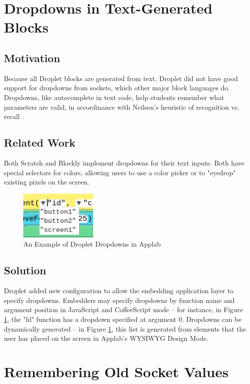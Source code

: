 \documentclass[conference]{IEEEtran}
\begin{document}
\section{Dropdowns in Text-Generated Blocks}

\subsection{Motivation}
Because all Droplet blocks are generated from text, Droplet did not have good support for dropdowns from sockets, which other major block languages do. Dropdowns, like autocomplete in text code, help students remember what parameters are valid, in accordinance with Neilsen's heuristic of recognition vs. recall \cite{Neilsen}.

\subsection{Related Work}
Both Scratch and Blockly implement dropdowns for their text inputs. Both have special selectors for colors, allowing users to use a color picker or to "eyedrop" existing pixels on the screen.

\begin{figure}
\centering
\includegraphics[width=1.5in]{dropdowns.png}
\caption{An Example of Droplet Dropdowns in Applab}
\label{dropdowns}
\end{figure}

\subsection{Solution}
Droplet added new configuration to allow the embedding application layer to specify dropdowns. Embedders may specify dropdowns by function name and argument position in JavaScript and CoffeeScript mode -- for instance, in Figure \ref{dropdowns}, the "fd" function has a dropdown specified at argument 0. Dropdowns can be dynamically generated -- in Figure \ref{dropdowns}, this list is generated from elements that the user has placed on the screen in Applab's WYSIWYG Design Mode.

\section{Remembering Old Socket Values}
\end{document}
